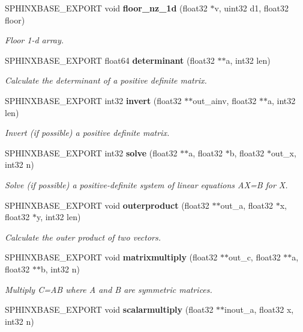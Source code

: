 \begin{DoxyCompactItemize}
S\+P\+H\+I\+N\+X\+B\+A\+S\+E\+\_\+\+E\+X\+P\+O\+RT void \textbf{ floor\+\_\+nz\+\_\+1d} (float32 $\ast$v, uint32 d1, float32 floor)
\begin{DoxyCompactList}\small\item\em Floor 1-\/d array. \end{DoxyCompactList}\item 
S\+P\+H\+I\+N\+X\+B\+A\+S\+E\+\_\+\+E\+X\+P\+O\+RT float64 \textbf{ determinant} (float32 $\ast$$\ast$a, int32 len)
\begin{DoxyCompactList}\small\item\em Calculate the determinant of a positive definite matrix. \end{DoxyCompactList}\item 
S\+P\+H\+I\+N\+X\+B\+A\+S\+E\+\_\+\+E\+X\+P\+O\+RT int32 \textbf{ invert} (float32 $\ast$$\ast$out\+\_\+ainv, float32 $\ast$$\ast$a, int32 len)
\begin{DoxyCompactList}\small\item\em Invert (if possible) a positive definite matrix. \end{DoxyCompactList}\item 
S\+P\+H\+I\+N\+X\+B\+A\+S\+E\+\_\+\+E\+X\+P\+O\+RT int32 \textbf{ solve} (float32 $\ast$$\ast$a, float32 $\ast$b, float32 $\ast$out\+\_\+x, int32 n)
\begin{DoxyCompactList}\small\item\em Solve (if possible) a positive-\/definite system of linear equations AX=B for X. \end{DoxyCompactList}\item 
S\+P\+H\+I\+N\+X\+B\+A\+S\+E\+\_\+\+E\+X\+P\+O\+RT void \textbf{ outerproduct} (float32 $\ast$$\ast$out\+\_\+a, float32 $\ast$x, float32 $\ast$y, int32 len)
\begin{DoxyCompactList}\small\item\em Calculate the outer product of two vectors. \end{DoxyCompactList}\item 
S\+P\+H\+I\+N\+X\+B\+A\+S\+E\+\_\+\+E\+X\+P\+O\+RT void \textbf{ matrixmultiply} (float32 $\ast$$\ast$out\+\_\+c, float32 $\ast$$\ast$a, float32 $\ast$$\ast$b, int32 n)
\begin{DoxyCompactList}\small\item\em Multiply C=AB where A and B are symmetric matrices. \end{DoxyCompactList}\item 
S\+P\+H\+I\+N\+X\+B\+A\+S\+E\+\_\+\+E\+X\+P\+O\+RT void \textbf{ scalarmultiply} (float32 $\ast$$\ast$inout\+\_\+a, float32 x, int32 n)
$$
\end{DoxyCompactItemize}
